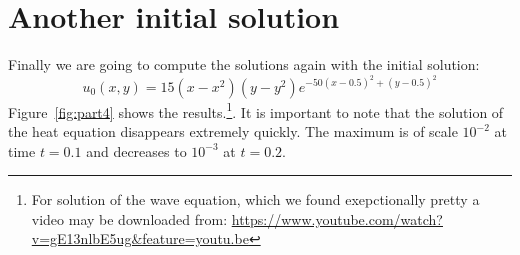 \section{Another initial solution}
Finally we are going to compute the solutions again with the initial solution:
\begin{equation}
u_0(x,y) = 15(x-x^2)(y - y^2) e^{-50(x-0.5)^2 + (y-0.5)^2}
\end{equation}
Figure~\ref*{fig:part4} shows the results.\footnote{For solution of the wave equation, which we found exepctionally pretty a video may be downloaded from: \url{https://www.youtube.com/watch?v=gE13nlbE5ug&feature=youtu.be}}. It is important to note that the solution of the heat equation disappears extremely quickly. The maximum is of scale $10^{-2}$ at time $t = 0.1$ and decreases to $10^{-3}$ at $t=0.2$.


